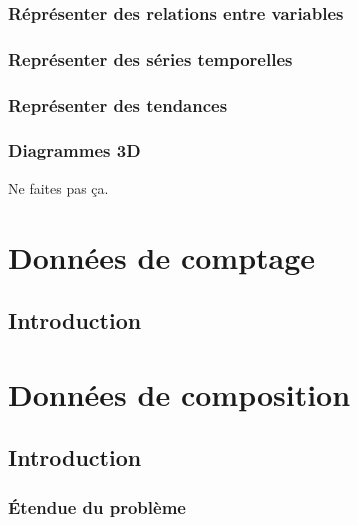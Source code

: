 \documentclass[
  french,
]{scrbook}
\begin{document}
\hypertarget{graph-xy}{%
\section{Réprésenter des relations entre variables}\label{graph-xy}}

\hypertarget{graph-series}{%
\section{Représenter des séries temporelles}\label{graph-series}}

\hypertarget{graph-tendances}{%
\section{Représenter des tendances}\label{graph-tendances}}

\hypertarget{diagrammes-3d}{%
\section{Diagrammes 3D}\label{diagrammes-3d}}

Ne faites pas ça.

\hypertarget{part-donnuxe9es-de-comptage}{%
\part{Données de comptage}\label{part-donnuxe9es-de-comptage}}

\hypertarget{introduction-2}{%
\chapter{Introduction}\label{introduction-2}}

\hypertarget{part-donnuxe9es-de-composition}{%
\part{Données de composition}\label{part-donnuxe9es-de-composition}}

\hypertarget{coda-introduction}{%
\chapter{Introduction}\label{coda-introduction}}

\hypertarget{coda-probleme}{%
\section{Étendue du problème}\label{coda-probleme}}
\end{document}
